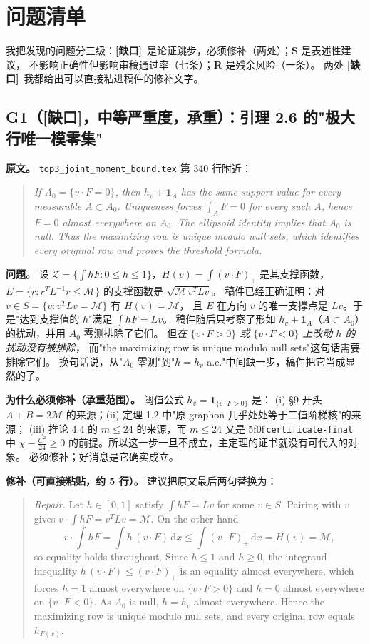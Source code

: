 \documentclass[UTF8,11pt]{ctexart}
\theoremstyle{definition}
\newcommand{\dd}{\,\mathrm{d}}
\newcommand{\peq}[1]{\textup{\u5f0f}\,\texttt{#1}}
\newcommand{\gap}{\textcolor[rgb]{0.70,0.15,0.10}{\bfseries [缺口]}}
\begin{document}
\section{问题清单}\label{sec:issues}

我把发现的问题分三级：\gap\ 是论证跳步，必须修补（两处）；\textbf{S} 是表述性建议，
不影响正确性但影响审稿通过率（七条）；\textbf{R} 是残余风险（一条）。
两处 \gap\ 我都给出可以直接粘进稿件的修补文字。

\subsection{G1（\gap，中等严重度，承重）：引理 2.6 的"极大行唯一模零集"}\label{sec:g1}

\textbf{原文。} \texttt{top3\_joint\_moment\_bound.tex} 第 340 行附近：
\begin{quote}\small\itshape
If $A_0=\{v\cdot F=0\}$, then $h_v+\mathbf1_A$ has the same support value for every measurable
$A\subset A_0$. Uniqueness forces $\int_AF=0$ for every such $A$, hence $F=0$ almost everywhere
on $A_0$. The ellipsoid identity implies that $A_0$ is null. Thus the maximizing row is unique
modulo null sets, which identifies every original row and proves the threshold formula.
\end{quote}

\textbf{问题。} 设 $\mathcal Z=\{\int hF:0\le h\le1\}$，$H(v)=\int(v\cdot F)_+$ 是其支撑函数，
$E=\{r:r^TL^{-1}r\le\mathcal M\}$ 的支撑函数是 $\sqrt{\mathcal M\,v^TLv}$。
稿件已经正确证明：对 $v\in S=\{v:v^TLv=\mathcal M\}$ 有 $H(v)=\mathcal M$，
且 $E$ 在方向 $v$ 的唯一支撑点是 $Lv$。于是"达到支撑值的 $h$"满足 $\int hF=Lv$。
稿件随后只考察了形如 $h_v+\mathbf1_A$（$A\subset A_0$）的扰动，并用 $A_0$ 零测排除了它们。
但\emph{在 $\{v\cdot F>0\}$ 或 $\{v\cdot F<0\}$ 上改动 $h$ 的扰动没有被排除}，
而"the maximizing row is unique modulo null sets"这句话需要排除它们。
换句话说，从"$A_0$ 零测"到"$h=h_v$ a.e."中间缺一步，稿件把它当成显然的了。

\textbf{为什么必须修补（承重范围）。} 阈值公式 $h_v=\mathbf1_{\{v\cdot F>0\}}$ 是：
(i) \S9 开头 $A+B=2\mathcal M$ 的来源；(ii) 定理 1.2 中"原 graphon 几乎处处等于二值阶梯核"的来源；
(iii) 推论 4.4 的 $m\le24$ 的来源，而 $m\le24$ 又是 \peq{certificate-final} 中
$\chi-\frac{C^2}{24}\ge0$ 的前提。所以这一步一旦不成立，主定理的证书就没有可代入的对象。
必须修补；好消息是它确实成立。

\textbf{修补（可直接粘贴，约 5 行）。} 建议把原文最后两句替换为：

\begin{quote}\small
\emph{Repair.} Let $h\in[0,1]$ satisfy $\int hF=Lv$ for some $v\in S$. Pairing with $v$ gives
$v\cdot\int hF=v^TLv=\mathcal M$. On the other hand
\[
 v\cdot\int hF=\int h\,(v\cdot F)\dd x\le\int(v\cdot F)_+\dd x=H(v)=\mathcal M ,
\]
so equality holds throughout. Since $h\le1$ and $h\ge0$, the integrand inequality
$h\,(v\cdot F)\le(v\cdot F)_+$ is an equality almost everywhere, which forces $h=1$ almost
everywhere on $\{v\cdot F>0\}$ and $h=0$ almost everywhere on $\{v\cdot F<0\}$. As $A_0$ is null,
$h=h_v$ almost everywhere. Hence the maximizing row is unique modulo null sets, and every original
row equals $h_{F(x)}$.
\end{quote}
\end{document}
